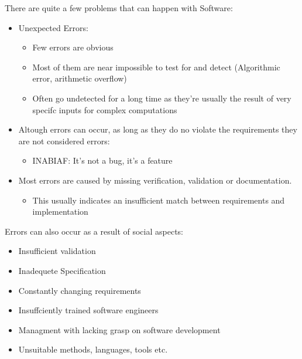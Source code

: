 \documentclass[
../../Software_Engineering_Summary.tex,
]
{subfiles}
\begin{document}
There are quite a few problems that can happen with Software:

\begin{greenbox*}
    \begin{itemize}
        \item Unexpected Errors:
        \begin{itemize}
            \item Few errors are obvious
            \item Most of them are near impossible to test for and detect (Algorithmic error, arithmetic overflow)
            \item Often go undetected for a long time as they're usually the result of very specifc inputs for complex computations
        \end{itemize}
        \item Altough errors can occur, as long as they do no violate the requirements they are not considered errors: 
        \begin{itemize}
            \item INABIAF: It's not a bug, it's a feature
        \end{itemize}
        \item Most errors are caused by missing verification, validation or documentation.
        \begin{itemize}
            \item This usually indicates an insufficient match between requirements and implementation
        \end{itemize}
    \end{itemize}
\end{greenbox*}

Errors can also occur as a result of social aspects:

\begin{greenbox*}
    \begin{itemize}
        \item Insufficient validation
        \item Inadequete Specification
        \item Constantly changing requirements
        \item Insuffciently trained software engineers
        \item Managment with lacking grasp on software development
        \item Unsuitable methods, languages, tools etc.
    \end{itemize}
\end{greenbox*}
\end{document}

